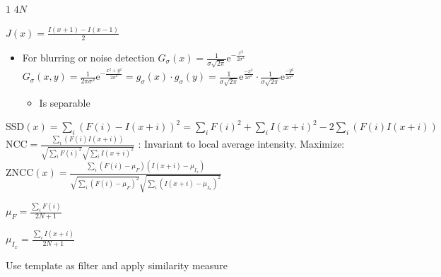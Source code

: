 \begin{itemize}
\begin{itemize}
                \begin{itemize*}
                     $1$
                     $4N$
                \end{itemize*}
        \end{itemize}
     $J(x) = \frac{I(x+1)-I(x-1)}{2}$
        \begin{itemize}
            \item For blurring or noise detection
             $G_\sigma(x) = \frac{1}{\sigma \sqrt{2 \pi}} \mathrm e^{-\frac{x^2}{2 \sigma^2}}$
             $G_\sigma(x, y) = \frac{1}{2 \pi \sigma^2} \mathrm e^{-\frac{x^2 + y^2}{2 \sigma ^2}} = g_\sigma(x) \cdot g_\sigma(y) =
                \tfrac{1}{\sigma \sqrt{2\pi}} \mathrm e^{\frac{-x^2}{2\sigma^2}}
                \cdot
                \tfrac{1}{\sigma \sqrt{2\pi}} \mathrm e^{\frac{-y^2}{2\sigma^2}}$
                \begin{itemize}
                    \item Is separable
                \end{itemize}
        \end{itemize}
        \begin{itemize}
             $\mathrm{SSD}(x) =
                \sum_i (F(i) - I(x+i))^2 =
                \sum_i F(i)^2 + \sum_i I(x+i)^2 - 2 \sum_i (F(i) I(x+i))$
             $\mathrm{NCC} =
                \frac{\sum_i (F(i)I(x + i))}
                {\sqrt{\sum_i F(i)^2} \sqrt{\sum_i I(x+i)^2}}$
            : Invariant to local average intensity. Maximize: $\mathrm{ZNCC}(x) =
                \frac{\sum_i (F(i)- \mu_F)(I(x + i) - \mu_{I_x})}
                {
                    \sqrt{\sum_i (F(i) - \mu_F)^2}
                    \sqrt{\sum_i (I(x+i) - \mu_{I_x})^2}
                }$
                \begin{itemize*}
                    \item $\mu_F = \frac{\sum_i F(i)}{2N + 1}$
                    \item $\mu_{I_x} = \frac{\sum_i I(x+i)}{2N + 1}$
                \end{itemize*}
        \end{itemize}
     Use template as filter and apply similarity measure

\end{itemize}
